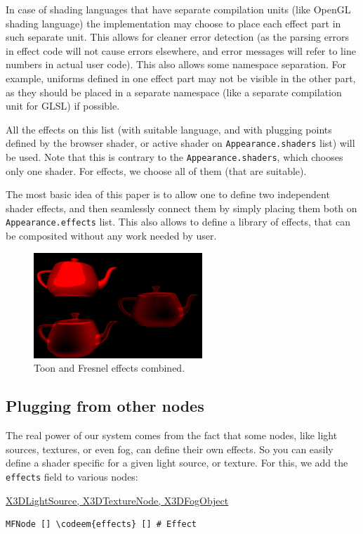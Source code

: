 \documentclass{acmsiggraph}                     %
\newenvironment{mycode}
{\begin{mycodecore}}
{\end{mycodecore}
\vspace{-0.1in}}
\newcommand*{\codeem}[1]{\textbf{#1}}
\begin{document}
In case of shading languages that have separate compilation units
(like OpenGL shading language) the implementation may choose to place
each effect part in such separate unit. This allows for cleaner error detection
(as the parsing errors in effect code will not cause errors elsewhere,
and error messages will refer to line numbers in actual user code).
This also allows some namespace separation. For example, uniforms defined in one
effect part may not be visible in the other part, as they should be placed
in a separate namespace (like a separate compilation unit for GLSL) if possible.

All the effects on this list (with suitable language, and with
plugging points defined by the browser shader, or active shader on
\texttt{Appearance.shaders} list) will be used. Note that this is contrary to
the \texttt{Appearance.shaders}, which chooses only one shader.
For effects, we choose all of them (that are suitable).

\needspace{1in}
The most basic idea of this paper is to allow one to define two
independent shader effects, and then seamlessly connect them by simply
placing them both on \texttt{Appearance.effects} list. This also allows to
define a library of effects, that can be composited without any work
needed by user.

\begin{figure}[H]
  \centering
  \includegraphics[width=2.5in]{fresnel_and_toon}
  \caption{Toon and Fresnel effects combined.}
\end{figure}

\subsection{Plugging from other nodes}

The real power of our system comes from the fact that some nodes,
like light sources, textures, or even fog, can define their own effects.
So you can easily define a shader specific for a given light source,
or texture. For this, we add the \texttt{effects} field to various nodes:

\begin{mycode}
\underline{X3DLightSource, X3DTextureNode, X3DFogObject}
\begin{Verbatim}[commandchars=\\\{\}]
MFNode [] \codeem{effects} [] # Effect
\end{Verbatim}
\end{mycode}
\end{document}
